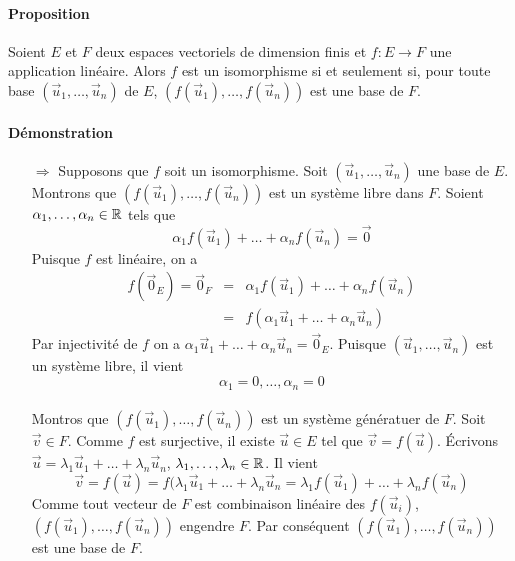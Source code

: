 \paragraph{Proposition} Soient $E$ et $F$ deux espaces vectoriels de dimension finis et $f: E \rightarrow F$ une application linéaire. Alors $f$ est un isomorphisme si et seulement si, pour toute base $(\vec{u}_1, \ldots, \vec{u}_n)$ de $E$, $(f(\vec{u}_1), \ldots, f(\vec{u}_n))$ est une base de $F$.

\paragraph{Démonstration} 
\begin{itemize}
  \item[$\Rightarrow$]Supposons que $f$ soit un isomorphisme. Soit $(\vec{u}_1, \ldots, \vec{u}_n)$ une base de $E$. Montrons que $(f(\vec{u}_1), \ldots, f(\vec{u}_n))$ est un système libre dans $F$. Soient $\alpha_1, \ldots, \alpha_n \in \mathbb{R}$ tels que 
    $$\alpha_1 f(\vec{u}_1) + \ldots + \alpha_n f(\vec{u}_n) = \vec{0}$$
    Puisque $f$ est linéaire, on a
    \begin{eqnarray*}
      f(\vec{0}_E) = \vec{0}_F &=& \alpha_1 f(\vec{u}_1) + \ldots + \alpha_n f(\vec{u}_n) \\
        &=& f(\alpha_1 \vec{u}_1 + \ldots + \alpha_n \vec{u}_n)
    \end{eqnarray*}
    Par injectivité de $f$ on a $\alpha_1 \vec{u}_1 + \ldots + \alpha_n \vec{u}_n = \vec{0}_E$. Puisque $(\vec{u}_1, \ldots, \vec{u}_n)$ est un système libre, il vient 
    $$\alpha_1 = 0, \ldots, \alpha_n = 0$$ \\
    Montros que $(f(\vec{u}_1), \ldots, f(\vec{u}_n))$ est un système génératuer de $F$. Soit $\vec{v} \in F$. Comme $f$ est surjective, il existe $\vec{u} \in E$ tel que $\vec{v} = f(\vec{u})$. Écrivons $\vec{u} = \lambda_1 \vec{u}_1 + \ldots + \lambda_n \vec{u}_n$, $\lambda_1, \ldots, \lambda_n \in \mathbb{R}$. Il vient
    $$\vec{v} = f(\vec{u}) = f(\lambda_1 \vec{u}_1 + \ldots + \lambda_n \vec{u}_n = \lambda_1 f(\vec{u}_1) + \ldots + \lambda_n f(\vec{u}_n)$$
    Comme tout vecteur de $F$ est combinaison linéaire des $f(\vec{u}_i)$, $(f(\vec{u}_1), \ldots, f(\vec{u}_n))$ engendre $F$. Par conséquent $(f(\vec{u}_1), \ldots, f(\vec{u}_n))$ est une base de $F$.
    

\end{itemize}
